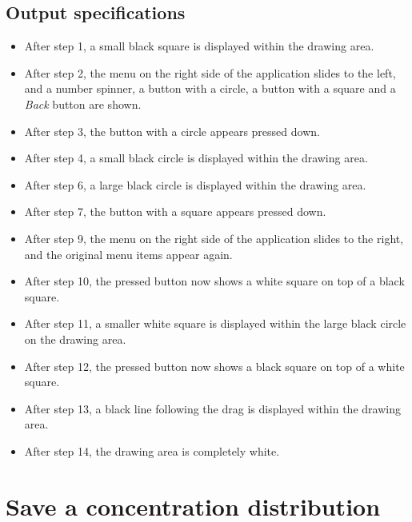 \subsection*{Output specifications}
\begin{itemize}
\item After step 1, a small black square is displayed within the drawing area.
\item After step 2,  the menu on the right side of the application slides to the left, and a number spinner, a button with a circle, a button with a square and a \emph{Back} button are shown.
\item After step 3, the button with a circle appears pressed down.
\item After step 4, a small black circle is displayed within the drawing area.

\item After step 6, a large black circle is displayed within the drawing area.
\item After step 7, the button with a square appears pressed down.
\item After step 9, the menu on the right side of the application slides to the right, and the original menu items appear again.
\item After step 10, the pressed button now shows a white square on top of a black square.

\item After step 11, a smaller white square is displayed within the large black circle on the drawing area.
\item After step 12, the pressed button now shows a black square on top of a white square.
\item After step 13, a black line following the drag is displayed within the drawing area.
\item After step 14, the drawing area is completely white.
\end{itemize}

\section{Save a concentration distribution}

